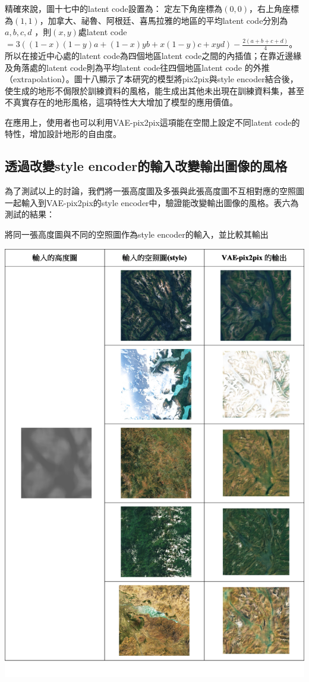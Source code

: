 \documentclass[a4paper, 12pt]{article}
\begin{document}
精確來說，圖十七中的latent code設置為：
定左下角座標為$(0,0)$，右上角座標為$(1,1)$，加拿大、祕魯、阿根廷、喜馬拉雅的地區的平均latent code分別為 $a,b,c,d$ ，則$(x,y)$處latent code $= 3((1-x)(1-y)a + (1-x)yb + x(1-y)c + xyd)-\frac{2(a+b+c+d)}{4}$。所以在接近中心處的latent code為四個地區latent code之間的內插值；在靠近邊緣及角落處的latent code則為平均latent code往四個地區latent code 的外推（extrapolation）。圖十八顯示了本研究的模型將pix2pix與style encoder結合後，使生成的地形不侷限於訓練資料的風格，能生成出其他未出現在訓練資料集，甚至不真實存在的地形風格，這項特性大大增加了模型的應用價值。

在應用上，使用者也可以利用VAE-pix2pix這項能在空間上設定不同latent code的特性，增加設計地形的自由度。


\subsection{透過改變style encoder的輸入改變輸出圖像的風格}
為了測試以上的討論，我們將一張高度圖及多張與此張高度圖不互相對應的空照圖一起輸入到VAE-pix2pix的style encoder中，驗證能改變輸出圖像的風格。表六為測試的結果：

\begin{table}[htbp]
    \centering
    \caption{將同一張高度圖與不同的空照圖作為style encoder的輸入，並比較其輸出}
    \label{tab:6}
    \includegraphics[width=0.8\linewidth]{fig/tab6.jpg}
\end{table}
\end{document}
